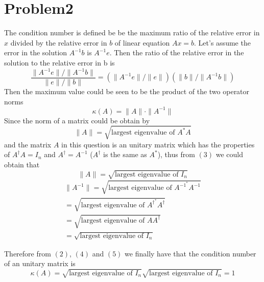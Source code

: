 \documentclass[11pt]{article}
\begin{document}
	\section{Problem2}
	\par The condition number is defined be be the maximum ratio of the relative error in $x$ divided by the relative error in $b$ of linear equation $Ax = b$. Let's assume the error in the solution $A^{-1}b$ is $A^{-1}e$. Then the ratio of the relative error in the solution to the relative error in b is
	\begin{equation}
		\frac{\|A^{-1}e\|/\|A^{-1}b\|}{\|e\|/\|b\|}
		= (\|A^{-1}e\|/\|e\|)(\|b\|/\|A^{-1}b\|)
	\end{equation}
	Then the maximum value could be seen to be the product of the two operator norms
	\begin{equation}
		\kappa(A) = \|A\|\cdot\|A^{-1}\|
	\end{equation}
	Since the norm of a matrix could be obtain by
	\begin{equation}
		\|A\| = \sqrt{\mbox{largest eigenvalue of }A^*A}
	\end{equation}
	and the matrix $A$ in this question is an unitary matrix which has the properties of $A^{\dagger}A = I_n$ and $A^{\dagger} = A^{-1}$ ($A^{\dagger}$ is the same as $A^*$), thus from $(3)$ we could obtain that
	\begin{equation}
		\|A\| = \sqrt{\mbox{largest eigenvalue of }I_n}
	\end{equation}
	\begin{equation}\begin{aligned}
		\|A^{-1}\| = \sqrt{\mbox{largest eigenvalue of }A^{-1^*}A^{-1}}\\
		= \sqrt{\mbox{largest eigenvalue of }A^{\dagger^*}A^{\dagger}}\\
		= \sqrt{\mbox{largest eigenvalue of }AA^{\dagger}}\\
		= \sqrt{\mbox{largest eigenvalue of }I_n}
	\end{aligned}\end{equation}
	\par Therefore from $(2)$, $(4)$ and $(5)$ we finally have that the condition number of an unitary matrix is
	\begin{equation}
		\kappa(A) = \sqrt{\mbox{largest eigenvalue of }I_n}\sqrt{\mbox{largest eigenvalue of }I_n} = 1
	\end{equation}
	
\end{document}
